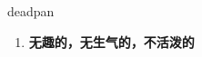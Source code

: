 
\begin{frame}
{\huge deadpan}
\begin{center}
\begin{enumerate}\Large
  \item \textbf{无趣的，无生气的，不活泼的}
\end{enumerate}
\end{center}
\end{frame}
